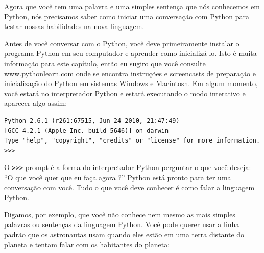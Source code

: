 Agora que você tem uma palavra e uma simples sentença que nós conhecemos em Python,
nós precisamos saber como iniciar uma conversação com Python para testar
nossas habilidades na nova linguagem.
%

Antes de você conversar com o Python, você deve primeiramente instalar o programa
Python em seu computador e aprender como inicializá-lo. Isto é muita informação
para este capítulo, então eu sugiro que você consulte \url{www.pythonlearn.com}
onde se encontra instruções e screencasts de preparação e inicialização do Python
em sistemas Windows e Macintosh. Em algum momento, você estará no interpretador
Python e estará executando o modo interativo e aparecer algo assim:


\beforeverb
\begin{verbatim}
Python 2.6.1 (r261:67515, Jun 24 2010, 21:47:49) 
[GCC 4.2.1 (Apple Inc. build 5646)] on darwin
Type "help", "copyright", "credits" or "license" for more information.
>>> 
\end{verbatim}
\afterverb
%

O {\tt >>>} prompt é a forma do interpretador Python perguntar o que você deseja:
``O que você quer que eu faça agora ?'' Python está pronto para ter uma conversação
com você. Tudo o que você deve conhecer é como falar a linguagem Python.
%

Digamos, por exemplo, que você não conhece nem mesmo as mais simples palavras
ou sentenças da linguagem Python. Você pode querer usar a linha padrão que os
astronautas usam quando eles estão em uma terra distante do planeta e tentam falar
com os habitantes do planeta:
%


